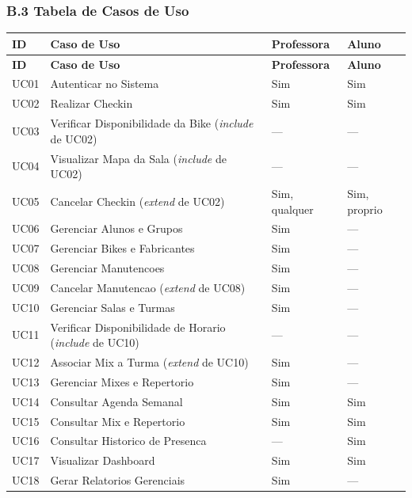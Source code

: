 \subsubsection*{B.3 Tabela de Casos de Uso}
\begin{longtable}{@{}>{\raggedright\arraybackslash}p{}>{\raggedright\arraybackslash}p{}>{\centering\arraybackslash}p{}>{\centering\arraybackslash}p{}@{}}
\toprule
\textbf{ID} & \textbf{Caso de Uso} & \textbf{Professora} & \textbf{Aluno} \\
\midrule
\endfirsthead
\toprule
\textbf{ID} & \textbf{Caso de Uso} & \textbf{Professora} & \textbf{Aluno} \\
\midrule
\endhead
UC01 & Autenticar no Sistema & Sim & Sim \\
UC02 & Realizar Checkin & Sim & Sim \\
UC03 & Verificar Disponibilidade da Bike (\textit{include} de UC02) & --- & --- \\
UC04 & Visualizar Mapa da Sala (\textit{include} de UC02) & --- & --- \\
UC05 & Cancelar Checkin (\textit{extend} de UC02) & Sim, qualquer & Sim, proprio \\
UC06 & Gerenciar Alunos e Grupos & Sim & --- \\
UC07 & Gerenciar Bikes e Fabricantes & Sim & --- \\
UC08 & Gerenciar Manutencoes & Sim & --- \\
UC09 & Cancelar Manutencao (\textit{extend} de UC08) & Sim & --- \\
UC10 & Gerenciar Salas e Turmas & Sim & --- \\
UC11 & Verificar Disponibilidade de Horario (\textit{include} de UC10) & --- & --- \\
UC12 & Associar Mix a Turma (\textit{extend} de UC10) & Sim & --- \\
UC13 & Gerenciar Mixes e Repertorio & Sim & --- \\
UC14 & Consultar Agenda Semanal & Sim & Sim \\
UC15 & Consultar Mix e Repertorio & Sim & Sim \\
UC16 & Consultar Historico de Presenca & --- & Sim \\
UC17 & Visualizar Dashboard & Sim & Sim \\
UC18 & Gerar Relatorios Gerenciais & Sim & --- \\
\bottomrule
\end{longtable}

